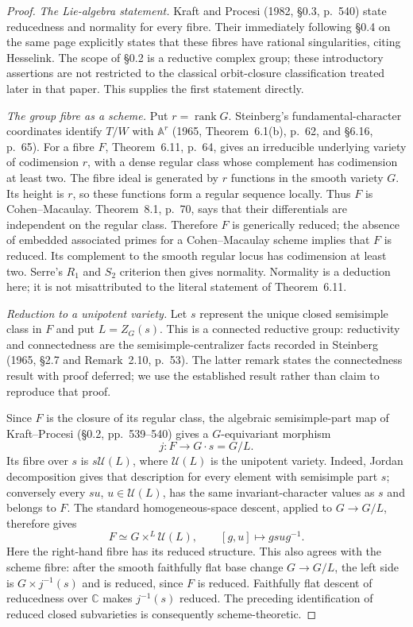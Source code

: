 \begin{proof}
\emph{The Lie-algebra statement.}
Kraft and Procesi (1982, \S0.3, p.~540) state reducedness and
normality for every fibre.  Their immediately following \S0.4 on
the same page explicitly states that these fibres have rational
singularities, citing Hesselink.  The scope of \S0.2 is a reductive
complex group; these introductory assertions are not restricted
to the classical orbit-closure classification treated later in that
paper.  This supplies the first statement directly.

\emph{The group fibre as a scheme.}
Put $r=\operatorname{rank}G$.  Steinberg's fundamental-character
coordinates identify $T/W$ with $\mathbb A^r$ (1965,
Theorem~6.1(b), p.~62, and \S6.16, p.~65).
For a fibre $F$, Theorem~6.11, p.~64, gives an irreducible
underlying variety of codimension $r$, with a dense regular class
whose complement has codimension at least two.
The fibre ideal is generated by $r$ functions in the smooth
variety $G$.  Its height is $r$, so these functions form a regular
sequence locally.  Thus $F$ is Cohen--Macaulay.  Theorem~8.1,
p.~70, says that their differentials are independent on the
regular class.  Therefore $F$ is generically reduced; the absence
of embedded associated primes for a Cohen--Macaulay scheme implies
that $F$ is reduced.  Its complement to the smooth regular locus
has codimension at least two.  Serre's $R_1$ and $S_2$ criterion
then gives normality.  Normality is a deduction here; it is not
misattributed to the literal statement of Theorem~6.11.

\emph{Reduction to a unipotent variety.}
Let $s$ represent the unique closed semisimple class in $F$ and
put $L=Z_G(s)$.  This is a connected reductive group: reductivity
and connectedness are the semisimple-centralizer facts recorded
in Steinberg (1965, \S2.7 and Remark~2.10, p.~53).  The latter
remark states the connectedness result with proof deferred; we
use the established result rather than claim to reproduce that
proof.

Since $F$ is the closure of its regular class, the algebraic
semisimple-part map of Kraft--Procesi (\S0.2, pp.~539--540) gives
a $G$-equivariant morphism
\[
 j:F\longrightarrow G\cdot s=G/L.
\]
Its fibre over $s$ is $s\mathcal U(L)$, where $\mathcal U(L)$ is
the unipotent variety.  Indeed, Jordan decomposition gives that
description for every element with semisimple part $s$; conversely
every $su$, $u\in\mathcal U(L)$, has the same invariant-character
values as $s$ and belongs to $F$.  The standard homogeneous-space
descent, applied to $G\to G/L$, therefore gives
\[
 F \simeq G\times^L \mathcal U(L),\qquad
 [g,u]\longmapsto gsu g^{-1}.
 \tag{SM23.1}
\]
Here the right-hand fibre has its reduced structure.  This also
agrees with the scheme fibre: after the smooth faithfully flat
base change $G\to G/L$, the left side is
$G\times j^{-1}(s)$ and is reduced, since $F$ is reduced.
Faithfully flat descent of reducedness over $\mathbb C$ makes
$j^{-1}(s)$ reduced.  The preceding identification of reduced
closed subvarieties is consequently scheme-theoretic.


\end{proof}
